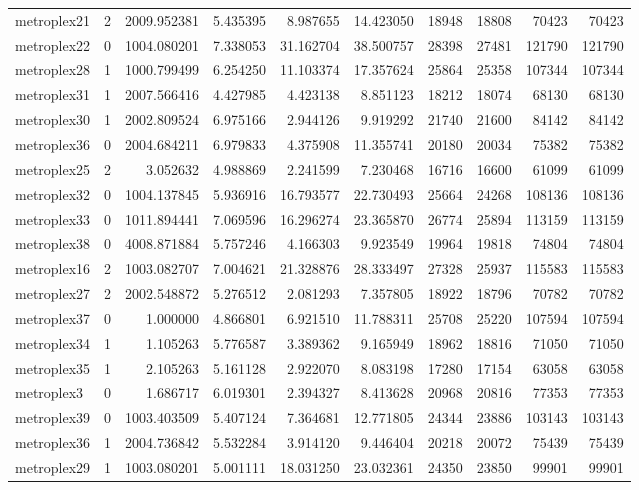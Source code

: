 \begin{longtable}{|l|r|r|r|r|r|r|r|r|r|}
metroplex21 & 2 & 2009.952381 & 5.435395 & 8.987655 & 14.423050 & 18948 & 18808 & 70423 & 70423 \\
metroplex22 & 0 & 1004.080201 & 7.338053 & 31.162704 & 38.500757 & 28398 & 27481 & 121790 & 121790 \\
metroplex28 & 1 & 1000.799499 & 6.254250 & 11.103374 & 17.357624 & 25864 & 25358 & 107344 & 107344 \\
metroplex31 & 1 & 2007.566416 & 4.427985 & 4.423138 & 8.851123 & 18212 & 18074 & 68130 & 68130 \\
metroplex30 & 1 & 2002.809524 & 6.975166 & 2.944126 & 9.919292 & 21740 & 21600 & 84142 & 84142 \\
metroplex36 & 0 & 2004.684211 & 6.979833 & 4.375908 & 11.355741 & 20180 & 20034 & 75382 & 75382 \\
metroplex25 & 2 & 3.052632 & 4.988869 & 2.241599 & 7.230468 & 16716 & 16600 & 61099 & 61099 \\
metroplex32 & 0 & 1004.137845 & 5.936916 & 16.793577 & 22.730493 & 25664 & 24268 & 108136 & 108136 \\
metroplex33 & 0 & 1011.894441 & 7.069596 & 16.296274 & 23.365870 & 26774 & 25894 & 113159 & 113159 \\
metroplex38 & 0 & 4008.871884 & 5.757246 & 4.166303 & 9.923549 & 19964 & 19818 & 74804 & 74804 \\
metroplex16 & 2 & 1003.082707 & 7.004621 & 21.328876 & 28.333497 & 27328 & 25937 & 115583 & 115583 \\
metroplex27 & 2 & 2002.548872 & 5.276512 & 2.081293 & 7.357805 & 18922 & 18796 & 70782 & 70782 \\
metroplex37 & 0 & 1.000000 & 4.866801 & 6.921510 & 11.788311 & 25708 & 25220 & 107594 & 107594 \\
metroplex34 & 1 & 1.105263 & 5.776587 & 3.389362 & 9.165949 & 18962 & 18816 & 71050 & 71050 \\
metroplex35 & 1 & 2.105263 & 5.161128 & 2.922070 & 8.083198 & 17280 & 17154 & 63058 & 63058 \\
metroplex3 & 0 & 1.686717 & 6.019301 & 2.394327 & 8.413628 & 20968 & 20816 & 77353 & 77353 \\
metroplex39 & 0 & 1003.403509 & 5.407124 & 7.364681 & 12.771805 & 24344 & 23886 & 103143 & 103143 \\
metroplex36 & 1 & 2004.736842 & 5.532284 & 3.914120 & 9.446404 & 20218 & 20072 & 75439 & 75439 \\
metroplex29 & 1 & 1003.080201 & 5.001111 & 18.031250 & 23.032361 & 24350 & 23850 & 99901 & 99901 \\

\end{longtable}
